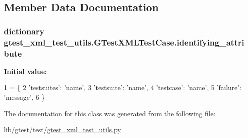 \subsection{Member Data Documentation}
\hypertarget{classgtest__xml__test__utils_1_1_g_test_x_m_l_test_case_a0e3a4e84e18f29d2248dcd670a0a6ae6}{
\subsubsection[{identifying\-\_\-attribute}]{\setlength{\rightskip}{0pt plus 5cm}dictionary gtest\-\_\-xml\-\_\-test\-\_\-utils.\-G\-Test\-X\-M\-L\-Test\-Case.\-identifying\-\_\-attribute\hspace{0.3cm}{\ttfamily [static]}}}\label{classgtest__xml__test__utils_1_1_g_test_x_m_l_test_case_a0e3a4e84e18f29d2248dcd670a0a6ae6}
{\bfseries Initial value\-:}
\begin{DoxyCode}
1 = \{
2     \textcolor{stringliteral}{'testsuites'}: \textcolor{stringliteral}{'name'},
3     \textcolor{stringliteral}{'testsuite'}: \textcolor{stringliteral}{'name'},
4     \textcolor{stringliteral}{'testcase'}:  \textcolor{stringliteral}{'name'},
5     \textcolor{stringliteral}{'failure'}:   \textcolor{stringliteral}{'message'},
6     \}
\end{DoxyCode}


The documentation for this class was generated from the following file\-:\begin{DoxyCompactItemize}
\item 
lib/gtest/test/\hyperlink{gtest__xml__test__utils_8py}{gtest\-\_\-xml\-\_\-test\-\_\-utils.\-py}\end{DoxyCompactItemize}
